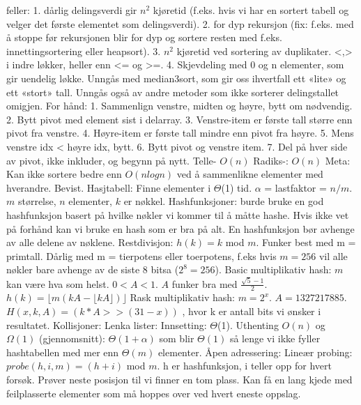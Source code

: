 \documentclass[10pt,a4paper]{article}
\begin{document}
\begin{multicols}{4}
{feller: 1. dårlig delingsverdi gir $n^2$ kjøretid (f.eks. hvis vi har en sortert tabell og velger det første elementet som delingsverdi). 2. for dyp rekursjon (fix: f.eks. med å stoppe før rekursjonen blir for dyp og sortere resten med f.eks. innettingsortering eller heapsort). 3. $n^2$ kjøretid ved sortering av duplikater. <,> i indre løkker, heller enn <= og >=. 4. Skjevdeling med 0 og n elementer, som gir uendelig løkke. Unngås med median3sort,
som gir oss ihvertfall ett «lite» og ett «stort» tall. Unngås også av andre metoder som
ikke sorterer delingstallet omigjen.
\color{orange}For hånd\color{black}:
1. Sammenlign venstre, midten og høyre, bytt om nødvendig. 2. Bytt pivot med element sist i delarray. 3. Venstre-item er første tall større enn pivot fra venstre. 4. Høyre-item er første tall mindre enn pivot fra høyre. 5. Mens venstre idx < høyre idx, bytt. 6. Bytt pivot og venstre item. 7. Del på hver side av pivot, ikke inkluder, og begynn på nytt.
\noindent
\color{red}Telle-\color{black}
$O(n)$
\noindent
\color{red}Radiks-\color{black}:
$O(n)$
\noindent
\noindent\color{red}Meta\color{black}:
Kan ikke sortere bedre enn $O(nlogn)$ ved å sammenlikne elementer med hverandre. Bevist.
\noindent
\color{red}Hasjtabell\color{black}:\newline
Finne elementer i $\Theta$(1) tid. $\alpha$ = lastfaktor = $n/m$. $m$ størrelse, $n$ elementer, $k$ er nøkkel.
Hashfunksjoner:  burde bruke en god hashfunksjon basert på hvilke nøkler vi kommer til å måtte hashe. Hvis ikke vet på forhånd kan vi bruke en hash som er bra på alt. En hashfunksjon bør avhenge av alle delene av nøklene.
\noindent
\color{red}Restdivisjon: \color{black} 
$h(k) = k$ mod $m$. Funker best med m = primtall. Dårlig med m = tierpotens eller toerpotens, f.eks hvis $m = 256$ vil alle nøkler bare avhenge av de siste 8 bitsa ($2^8 = 256$).
\newline
\noindent
\color{red}Basic multiplikativ hash: \color{black} 
$m$ kan være hva som helst. $0 < A < 1$. $A$ funker bra med $\frac{\sqrt{5}-1}{2}$. $h(k) = \lfloor m(kA-\lfloor kA \rfloor ) \rfloor$
\noindent
\color{red}Rask multiplikativ hash: \color{black} $m = 2^x$. $A=1327217885$. $H(x,k,A) = (k*A >> (31-x))$ , hvor k er antall bits vi ønsker i resultatet.
\noindent
\color{red}Kollisjoner: Lenka lister: \color{black} Innsetting: $\Theta$(1). Uthenting $O(n)$ og $\Omega(1)$ (gjennomsnitt): $\Theta(1 + \alpha)$ som blir $\Theta(1)$ så lenge vi ikke fyller hashtabellen med mer enn $\Theta(m)$ elementer. 
\noindent
\color{red}Åpen adressering: Lineær probing: \color{black} $probe(h, i, m) = (h+i)$ mod $m$. h er hashfunksjon, i teller opp for hvert forsøk. Prøver neste posisjon til vi finner en tom plass. Kan få en lang kjede med feilplasserte elementer som må hoppes over ved hvert eneste oppslag.
}
\end{multicols}
\end{document}
